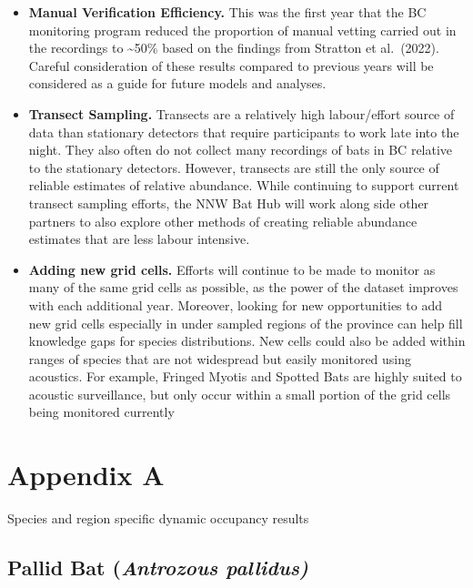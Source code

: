 \documentclass[
  letterpaper,
  DIV=11,
  numbers=noendperiod]{scrartcl}
\begin{document}
\begin{itemize}
\item
  \textbf{Manual Verification Efficiency.} This was the first year that
  the BC monitoring program reduced the proportion of manual vetting
  carried out in the recordings to \textasciitilde50\% based on the
  findings from Stratton et al.~(2022). Careful consideration of these
  results compared to previous years will be considered as a guide for
  future models and analyses.
\item
  \textbf{Transect Sampling.} Transects are a relatively high
  labour/effort source of data than stationary detectors that require
  participants to work late into the night. They also often do not
  collect many recordings of bats in BC relative to the stationary
  detectors. However, transects are still the only source of reliable
  estimates of relative abundance. While continuing to support current
  transect sampling efforts, the NNW Bat Hub will work along side other
  partners to also explore other methods of creating reliable abundance
  estimates that are less labour intensive.
\item
  \textbf{Adding new grid cells.} Efforts will continue to be made to
  monitor as many of the same grid cells as possible, as the power of
  the dataset improves with each additional year. Moreover, looking for
  new opportunities to add new grid cells especially in under sampled
  regions of the province can help fill knowledge gaps for species
  distributions. New cells could also be added within ranges of species
  that are not widespread but easily monitored using acoustics. For
  example, Fringed Myotis and Spotted Bats are highly suited to acoustic
  surveillance, but only occur within a small portion of the grid cells
  being monitored currently
\end{itemize}

\newpage{}

\newpage{}

\section{Appendix A}\label{appendix-a}

Species and region specific dynamic occupancy results

\subsection{\texorpdfstring{Pallid Bat (\emph{Antrozous
pallidus)}}{Pallid Bat (Antrozous pallidus)}}\label{pallid-bat-antrozous-pallidus}
\end{document}
